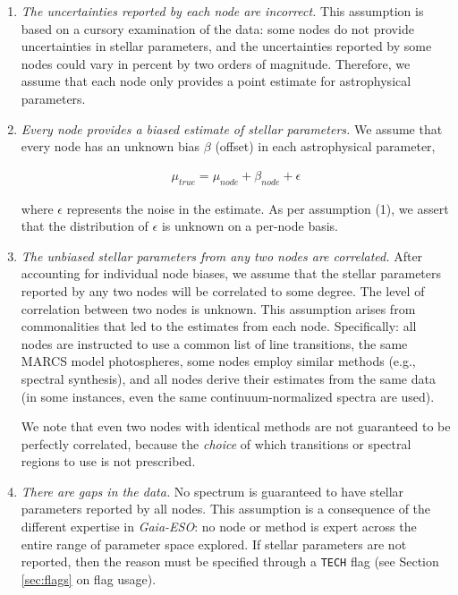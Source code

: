 \documentclass[preprint]{aastex}
\newcommand{\project}[1]{\textsl{#1}}
\newcommand{\gaiaeso}{\project{Gaia-ESO}}
\begin{document}
\begin{enumerate}
    \item   \emph{The uncertainties reported by each node are incorrect.}
            This assumption is based on a cursory examination of the data:
            some nodes do not provide uncertainties in stellar parameters, and
            the uncertainties reported by some nodes could vary in percent by
            two orders of magnitude. Therefore, we assume that each node only
            provides a point estimate for astrophysical parameters.

    \item   \emph{Every node provides a biased estimate of stellar parameters.}
            We assume that every node has an unknown bias $\beta$ (offset) in each
            astrophysical parameter, 

            \begin{eqnarray}
                \mu_{true} = \mu_{node} + \beta_{node} + \epsilon
            \end{eqnarray}

            \noindent{}where $\epsilon$ represents the noise in the estimate. As per
            assumption (1), we assert that the distribution of $\epsilon$ is unknown
            on a per-node basis.

    \item   \emph{The unbiased stellar parameters from any two nodes are correlated.}
            After accounting for individual node biases, we assume that the 
            stellar parameters reported by any two nodes will be correlated
            to some degree. The level of correlation between two nodes is unknown.
            This assumption arises from commonalities that led to the estimates from
            each node. Specifically: all nodes are instructed to use a common list 
            of line transitions, the same MARCS model photospheres, some nodes employ
            similar methods (e.g., spectral synthesis), and all nodes derive their 
            estimates from the same data (in some instances, even the same 
            continuum-normalized spectra are used).

            We note that even two nodes with identical methods are not guaranteed
            to be perfectly correlated, because the \emph{choice} of which transitions
            or spectral regions to use is not prescribed.

    \item   \emph{There are gaps in the data.} 
            No spectrum is guaranteed to have stellar parameters reported by all
            nodes. This assumption is a consequence of the different expertise in
            \gaiaeso: no node or method is expert across the entire range of parameter
            space explored. If stellar parameters are not reported, then the reason 
            must be specified through a \texttt{TECH} flag (see Section \ref{sec:flags}
            on flag usage).


\end{enumerate}
\end{document}
